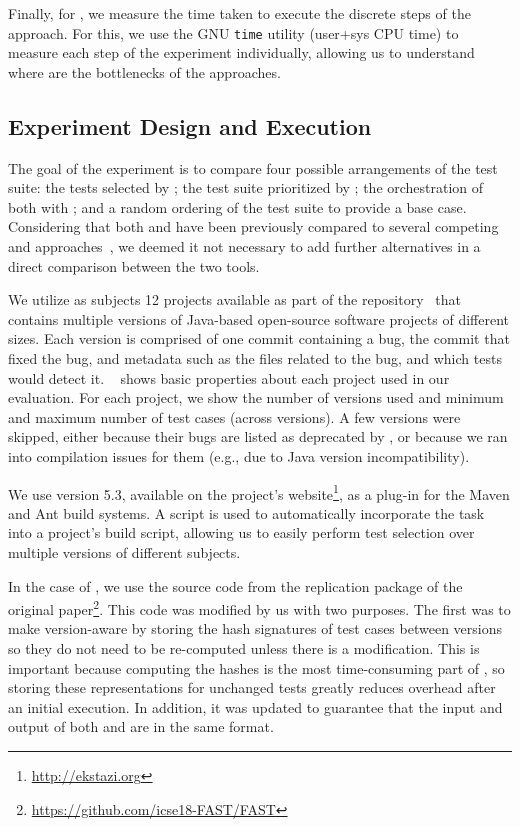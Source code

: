 Finally, for , we measure the time taken to execute the discrete steps of the approach.
For this, we use the GNU \texttt{time} utility (user+sys CPU time) to measure each step of the experiment individually, allowing us to understand where are the bottlenecks of the approaches.

\subsection{Experiment Design and Execution}
\label{subsec:experiment}



The goal of the experiment is to compare four possible arrangements of the test suite: 
the tests selected by \ek; the test suite prioritized by \fs; the orchestration of both with \fz; and a random ordering of the test suite to provide a base case.
Considering that both \ek and \fs have been previously compared to several competing \tcs and \tcp approaches~\cite{legunsen2016, zhang_hybrid_2018, miranda_fast_2018}, we deemed it not necessary to add further alternatives in a direct comparison between the two tools.

We utilize as subjects 12 projects available as part of the \dfj repository~\cite{just2014defects4j} that contains multiple versions of Java-based open-source software projects of different sizes.
Each version is comprised of one commit containing a bug, the commit that fixed the bug, and metadata such as the files related to the bug, and which tests would detect it.
~ shows basic properties about each project
used in our evaluation.
For each project, we show the number of versions used and minimum and maximum number of test cases (across versions).
A few versions were skipped, either because their bugs are listed as deprecated by \dfj, or because we ran into compilation issues for them (e.g., due to Java version incompatibility).

We use \ek version 5.3, available on the project's website\footnote{\url{http://ekstazi.org}}, as a plug-in for the Maven and Ant build systems.
A script is used to automatically incorporate the \ek task into a project's build script, allowing us to easily perform test selection over multiple versions of different subjects.

In the case of \fs, we use the source code from the replication package of the original paper\footnote{\url{https://github.com/icse18-FAST/FAST}}.
This code was modified by us with two purposes.
The first was to make \fs version-aware by storing the hash signatures of test cases between versions so they do not need to be re-computed unless there is a modification.
This is important because computing the hashes is the most time-consuming part of \fs, so storing these representations for unchanged tests greatly reduces overhead after an initial execution.
In addition, it was updated to guarantee that the input and output of both \ek and \fs are in the same format.

